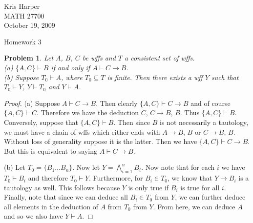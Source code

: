 \documentclass{article}
\newtheorem{problem}{Problem}
\begin{document}
\begin{flushright}
Kris Harper\\

MATH 27700\\

October 19, 2009
\end{flushright}

\begin{center}
Homework 3
\end{center}

\begin{problem}
Let $A$, $B$, $C$ be wffs and $T$ a consistent set of wffs.\\
(a) $\{A, C\} \vdash B$ if and only if $A \vdash C \rightarrow B$.\\
(b) Suppose $T_0 \vdash A$, where $T_0 \subseteq T$ is finite. Then there exists a wff $Y$ such that $T_0 \vdash Y$, $Y \vdash T_0$ and $Y \vdash A$.
\end{problem}
\begin{proof}
(a) Suppose $A \vdash C \rightarrow B$. Then clearly $\{A, C\} \vdash C \rightarrow B$ and of course $\{A, C\} \vdash C$. Therefore we have the deduction $C$, $C \rightarrow B$, $B$. Thus $\{A, C\} \vdash B$. Conversely, suppose that $\{A, C\} \vdash B$. Then since $B$ is not necessarily a tautology, we must have a chain of wffs which either ends with $A \rightarrow B$, $B$ or $C \rightarrow B$, $B$. Without loss of generality suppose it is the latter. Then we have $\{A, C\} \vdash C \rightarrow B$. But this is equivalent to saying $A \vdash C \rightarrow B$.

(b) Let $T_0 = \{B_1 \dots B_n\}$. Now let $Y = \bigwedge_{i=1}^n B_i$. Now note that for each $i$ we have $T_0 \vdash B_i$ and therefore $T_0 \vdash Y$. Furthermore, for $B_i \in T_0$, we know that $Y \rightarrow B_i$ is a tautology as well. This follows because $Y$ is only true if $B_i$ is true for all $i$. Finally, note that since we can deduce all $B_i \in T_0$ from $Y$, we can further deduce all elements in the deduction of $A$ from $T_0$ from $Y$. From here, we can deduce $A$ and so we also have $Y \vdash A$.
\end{proof}
\end{document}
